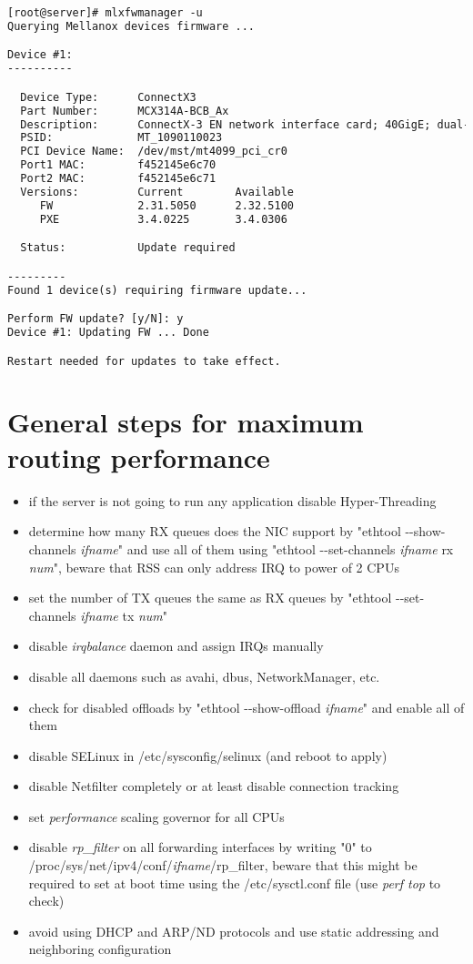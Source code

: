 \begin{lstlisting}[language=TeX,label={lst:setup-firmware-update},caption={Firmware update procedure}]
[root@server]# mlxfwmanager -u
Querying Mellanox devices firmware ...

Device #1:
----------

  Device Type:      ConnectX3
  Part Number:      MCX314A-BCB_Ax
  Description:      ConnectX-3 EN network interface card; 40GigE; dual-port QSFP; PCIe3.0 x8 8GT/s; RoHS R6
  PSID:             MT_1090110023
  PCI Device Name:  /dev/mst/mt4099_pci_cr0
  Port1 MAC:        f452145e6c70
  Port2 MAC:        f452145e6c71
  Versions:         Current        Available     
     FW             2.31.5050      2.32.5100     
     PXE            3.4.0225       3.4.0306      

  Status:           Update required

---------
Found 1 device(s) requiring firmware update...

Perform FW update? [y/N]: y
Device #1: Updating FW ... Done

Restart needed for updates to take effect.
\end{lstlisting}

\chapter{General steps for maximum routing performance}\label{app:general-steps}
\begin{itemize}
\item if the server is not going to run any application disable Hyper-Threading
\item determine how many RX queues does the NIC support by "ethtool -{}-show-channels {\it{ifname}}" and use all of them using
"ethtool -{}-set-channels {\it{ifname}} rx {\it{num}}", beware that RSS can only address IRQ to power of 2 CPUs
\item set the number of TX queues the same as RX queues by "ethtool -{}-set-channels {\it{ifname}} tx {\it{num}}"
\item disable {\it{irqbalance}} daemon and assign IRQs manually
\item disable all daemons such as avahi, dbus, NetworkManager, etc.
\item check for disabled offloads by "ethtool -{}-show-offload {\it{ifname}}" and enable all of them
\item disable SELinux in /etc/sysconfig/selinux (and reboot to apply)
\item disable Netfilter completely or at least disable connection tracking
\item set {\it{performance}} scaling governor for all CPUs
\item disable {\it{rp\_filter}} on all forwarding interfaces by writing "0" to /proc/sys/net/ipv4/conf/{\it{ifname}}/rp\_filter,
beware that this might be required to set at boot time using the /etc/sysctl.conf file (use {\it{perf top}} to check)
\item avoid using DHCP and ARP/ND protocols and use static addressing and neighboring configuration
\end{itemize}
